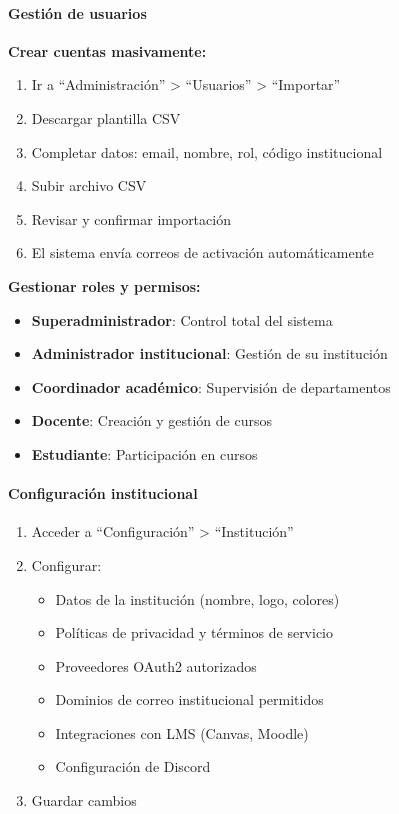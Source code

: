 \paragraph{Gestión de usuarios}

\textbf{Crear cuentas masivamente:}

\begin{enumerate}
	\item Ir a ``Administración'' > ``Usuarios'' > ``Importar''
	\item Descargar plantilla CSV
	\item Completar datos: email, nombre, rol, código institucional
	\item Subir archivo CSV
	\item Revisar y confirmar importación
	\item El sistema envía correos de activación automáticamente
\end{enumerate}

\textbf{Gestionar roles y permisos:}

\begin{itemize}
	\item \textbf{Superadministrador}: Control total del sistema
	\item \textbf{Administrador institucional}: Gestión de su institución
	\item \textbf{Coordinador académico}: Supervisión de departamentos
	\item \textbf{Docente}: Creación y gestión de cursos
	\item \textbf{Estudiante}: Participación en cursos
\end{itemize}

\paragraph{Configuración institucional}

\begin{enumerate}
	\item Acceder a ``Configuración'' > ``Institución''
	\item Configurar:
	\begin{itemize}
		\item Datos de la institución (nombre, logo, colores)
		\item Políticas de privacidad y términos de servicio
		\item Proveedores OAuth2 autorizados
		\item Dominios de correo institucional permitidos
		\item Integraciones con LMS (Canvas, Moodle)
		\item Configuración de Discord
	\end{itemize}
	\item Guardar cambios
\end{enumerate}

